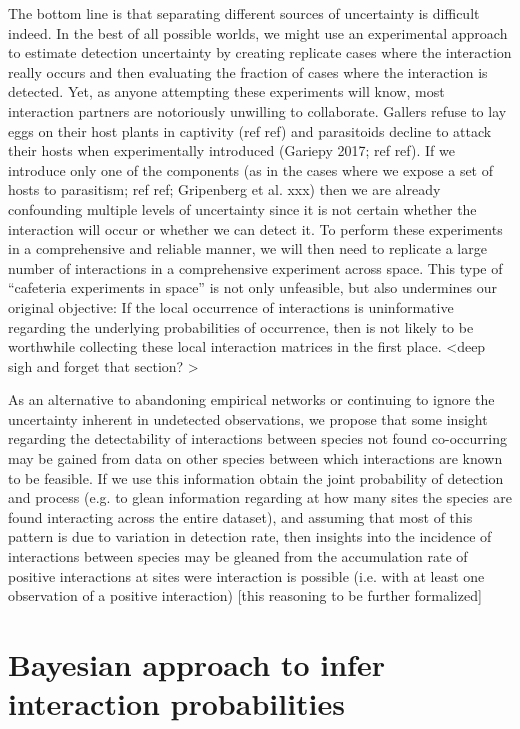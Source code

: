 \documentclass[12pt]{article}
\begin{document}
  The bottom line is that separating different sources of uncertainty is difficult indeed. In the best of all possible worlds, we might use an experimental approach to estimate detection uncertainty by creating replicate cases where the interaction really occurs and then evaluating the fraction of cases where the interaction is detected. Yet, as anyone attempting these experiments will know, most interaction partners are notoriously unwilling to collaborate. Gallers refuse to lay eggs on their host plants in captivity (ref ref) and parasitoids decline to attack their hosts when experimentally introduced (Gariepy 2017; ref ref). If we introduce only one of the components (as in the cases where we expose a set of hosts to parasitism; ref ref; Gripenberg et al. xxx) then we are already confounding multiple levels of uncertainty since it is not certain whether the interaction will occur or whether we can detect it. To perform these experiments in a comprehensive and reliable manner, we will then need to replicate a large number of interactions in a comprehensive experiment across space. This type of “cafeteria experiments in space” is not only unfeasible, but also undermines our original objective: If the local occurrence of interactions is uninformative regarding the underlying probabilities of occurrence, then is not likely to be worthwhile collecting these local interaction matrices in the first place. <deep sigh and forget that section? > 


  As an alternative to abandoning empirical networks or continuing to ignore the uncertainty inherent in undetected observations, we propose that some insight regarding the detectability of interactions between species not found co-occurring may be gained from data on other species between which interactions are known to be feasible. If we use this information obtain the joint probability of detection and process (e.g. to glean information regarding at how many sites the species are found interacting across the entire dataset), and assuming that most of this pattern is due to variation in detection rate, then insights into the incidence of interactions between species may be gleaned from the accumulation rate of positive interactions at sites were interaction is possible (i.e. with at least one observation of a positive interaction) [this reasoning to be further formalized]


\section*{Bayesian approach to infer interaction probabilities}
\end{document}

